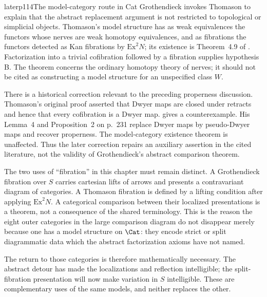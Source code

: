 \begin{dcomment}{later}{p114}{The model-category route in Cat}
Grothendieck invokes Thomason to explain that the abstract replacement argument is not restricted to topological or simplicial objects. Thomason's model structure has as weak equivalences the functors whose nerves are weak homotopy equivalences, and as fibrations the functors detected as Kan fibrations by $\mathrm{Ex}^2N$; its existence is Theorem~4.9 of \citet{Thomason1980}. Factorization into a trivial cofibration followed by a fibration supplies hypothesis B. The theorem concerns the ordinary homotopy theory of nerves; it should not be cited as constructing a model structure for an unspecified class $W$.

There is a historical correction relevant to the preceding properness discussion. Thomason's original proof asserted that Dwyer maps are closed under retracts and hence that every cofibration is a Dwyer map. \citet[pp.~228--229]{Cisinski1999Dwyer} gives a counterexample. His Lemma~4 and Proposition~2 on p.~231 replace Dwyer maps by pseudo-Dwyer maps and recover properness. The model-category existence theorem is unaffected. Thus the later correction repairs an auxiliary assertion in the cited literature, not the validity of Grothendieck's abstract comparison theorem.

The two uses of ``fibration'' in this chapter must remain distinct. A Grothendieck fibration over $S$ carries cartesian lifts of arrows and presents a contravariant diagram of categories. A Thomason fibration is defined by a lifting condition after applying $\mathrm{Ex}^2N$. A categorical comparison between their localized presentations is a theorem, not a consequence of the shared terminology. This is the reason the eight outer categories in the large comparison diagram do not disappear merely because one has a model structure on $\Cat$: they encode strict or split diagrammatic data which the abstract factorization axioms have not named.

The return to those categories is therefore mathematically necessary. The abstract detour has made the localizations and reflection intelligible; the split-fibration presentation will now make variation in $S$ intelligible. These are complementary uses of the same models, and neither replaces the other.
\end{dcomment}


